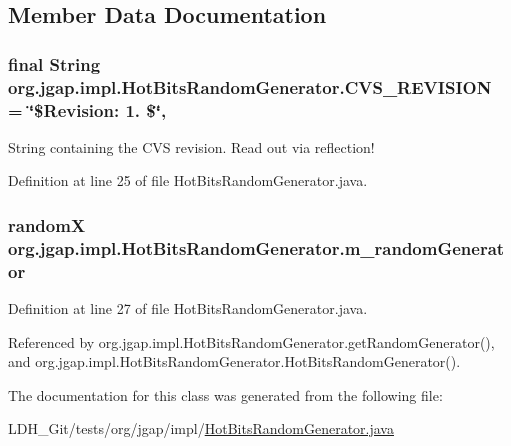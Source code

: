 \subsection{Member Data Documentation}
\hypertarget{classorg_1_1jgap_1_1impl_1_1_hot_bits_random_generator_a902b9dbe4496da72c6c3807a0c266523}{
\subsubsection[{C\-V\-S\-\_\-\-R\-E\-V\-I\-S\-I\-O\-N}]{\setlength{\rightskip}{0pt plus 5cm}final String org.\-jgap.\-impl.\-Hot\-Bits\-Random\-Generator.\-C\-V\-S\-\_\-\-R\-E\-V\-I\-S\-I\-O\-N = \char`\"{}\$Revision\-: 1. \$\char`\"{}\hspace{0.3cm}{\ttfamily [static]}, {\ttfamily [private]}}}\label{classorg_1_1jgap_1_1impl_1_1_hot_bits_random_generator_a902b9dbe4496da72c6c3807a0c266523}
String containing the C\-V\-S revision. Read out via reflection! 

Definition at line 25 of file Hot\-Bits\-Random\-Generator.\-java.

\hypertarget{classorg_1_1jgap_1_1impl_1_1_hot_bits_random_generator_afb3d4f751eec2635618aee7d91323a63}{
\subsubsection[{m\-\_\-random\-Generator}]{\setlength{\rightskip}{0pt plus 5cm}random\-X org.\-jgap.\-impl.\-Hot\-Bits\-Random\-Generator.\-m\-\_\-random\-Generator\hspace{0.3cm}{\ttfamily [private]}}}\label{classorg_1_1jgap_1_1impl_1_1_hot_bits_random_generator_afb3d4f751eec2635618aee7d91323a63}


Definition at line 27 of file Hot\-Bits\-Random\-Generator.\-java.



Referenced by org.\-jgap.\-impl.\-Hot\-Bits\-Random\-Generator.\-get\-Random\-Generator(), and org.\-jgap.\-impl.\-Hot\-Bits\-Random\-Generator.\-Hot\-Bits\-Random\-Generator().



The documentation for this class was generated from the following file\-:\begin{DoxyCompactItemize}
\item 
L\-D\-H\-\_\-\-Git/tests/org/jgap/impl/\hyperlink{_hot_bits_random_generator_8java}{Hot\-Bits\-Random\-Generator.\-java}\end{DoxyCompactItemize}
